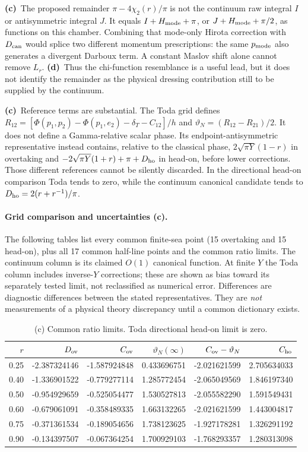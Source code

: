 \documentclass[11pt,a4paper]{article}
\newcommand{\Lc}{\textbf{(c)}\ }
\newcommand{\Ld}{\textbf{(d)}\ }
\begin{document}
\Lc The proposed remainder $\pi-4\chi_2(r)/\pi$ is not the continuum raw
integral $I$ or antisymmetric integral $J$. It equals $I+H_{\rm mode}+\pi$,
or $J+H_{\rm mode}+\pi/2$, as functions on this chamber. Combining that
mode-only Hirota correction with $D_{\rm can}$ would splice two different
momentum prescriptions: the same $p_{\rm mode}$ also generates a divergent
Darboux term. A constant Maslov shift alone cannot remove $L_r$.
\Ld Thus the chi-function resemblance is a useful lead, but it does not
identify the remainder as the physical dressing contribution still to be
supplied by the continuum.

\Lc Reference terms are substantial. The Toda grid defines
$R_{12}=[\Phi(p_1,p_2)-\Phi(p_1,e_2)-\delta_T-C_{12}]/h$ and
$\vartheta_N=(R_{12}-R_{21})/2$. It does not define a Gamma-relative scalar
phase. Its endpoint-antisymmetric representative instead contains, relative
to the classical phase, $2\sqrt{\pi Y}(1-r)$ in overtaking and
$-2\sqrt{\pi Y}(1+r)+\pi+D_{\rm ho}$ in head-on, before lower corrections.
Those different references cannot be silently discarded. In the directional
head-on comparison Toda tends to zero, while the continuum canonical
candidate tends to $D_{\rm ho}=2(r+r^{-1})/\pi$.

\paragraph{Grid comparison and uncertainties (c).}
The following tables list every common finite-sea point (15 overtaking and
15 head-on), plus all 17 common half-line points and the common ratio limits.
The continuum column is its claimed $O(1)$ canonical function. At finite
$Y$ the Toda column includes inverse-$Y$ corrections; these are shown as
bias toward its separately tested limit, not reclassified as numerical error.
Differences are diagnostic differences between the stated representatives.
They are \emph{not} measurements of a physical theory discrepancy until a
common dictionary exists.


\begingroup\small\setlength{\tabcolsep}{4pt}
\begin{longtable}{@{}rrrrrr@{}}
\caption{(c) Common ratio limits. Toda directional head-on limit is zero.}\\
\toprule $r$ & $D_{\rm ov}$ & $C_{\rm ov}$ & $\vartheta_N(\infty)$ & $C_{\rm ov}-\vartheta_N$ & $C_{\rm ho}$\\\midrule\endhead
0.25 & -2.387324146 & -1.587924848 & 0.433696751 & -2.021621599 & 2.705634033\\
0.40 & -1.336901522 & -0.779277114 & 1.285772454 & -2.065049569 & 1.846197340\\
0.50 & -0.954929659 & -0.525054477 & 1.530527813 & -2.055582290 & 1.591549431\\
0.60 & -0.679061091 & -0.358489335 & 1.663132265 & -2.021621599 & 1.443004817\\
0.75 & -0.371361534 & -0.189054656 & 1.738123625 & -1.927178281 & 1.326291192\\
0.90 & -0.134397507 & -0.067364254 & 1.700929103 & -1.768293357 & 1.280313098\\
\bottomrule\end{longtable}\endgroup
\end{document}
